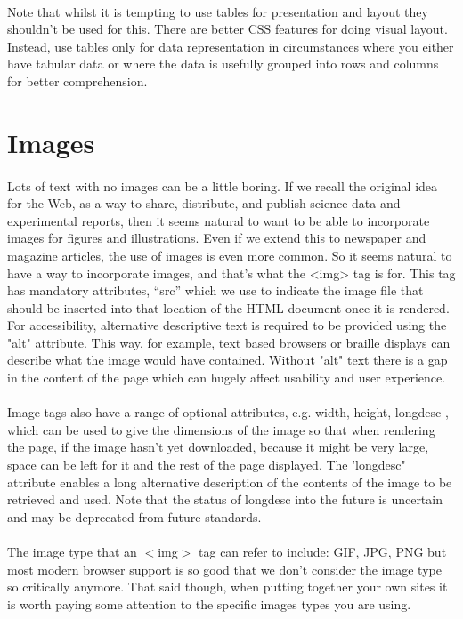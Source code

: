 \paragraph{} Note that whilst it is tempting to use tables for presentation and layout they shouldn't be used for this. There are better CSS features for doing visual layout. Instead, use tables only for data representation in circumstances where you either have tabular data or where the data is usefully grouped into rows and columns for better comprehension.

\section{Images}
\paragraph{} Lots of text with no images can be a little boring. If we recall the original idea for the Web, as a way to share, distribute, and publish science data and experimental reports, then it seems natural to want to be able to incorporate images for figures and illustrations. Even if we extend this to newspaper and magazine articles, the use of images is even more common. So it seems natural to have a way to incorporate images, and that's what the <img> tag is for. This tag has mandatory attributes, ``src'' which we use to indicate the image file that should be inserted into that location of the HTML document once it is rendered. For accessibility, alternative descriptive text is required to be provided using the "alt" attribute. This way, for example, text based browsers or braille displays can describe what the image would have contained. Without "alt" text there is a gap in the content of the page which can hugely affect usability and user experience.
\paragraph{} Image tags also have a range of optional attributes, e.g. width, height, longdesc , which can be used to give the dimensions of the image so that when rendering the page, if the image hasn't yet downloaded, because it might be very large, space can be left for it and the rest of the page displayed. The 'longdesc" attribute enables a long alternative description of the contents of the image to be retrieved and used. Note that the status of longdesc into the future is uncertain and may be deprecated from future standards.
\paragraph{} The image type that an $<$img$>$ tag can refer to include: GIF, JPG, PNG but most modern browser support is so good that we don’t consider the image type so critically anymore. That said though, when putting together your own sites it is worth paying some attention to the specific images types you are using.


